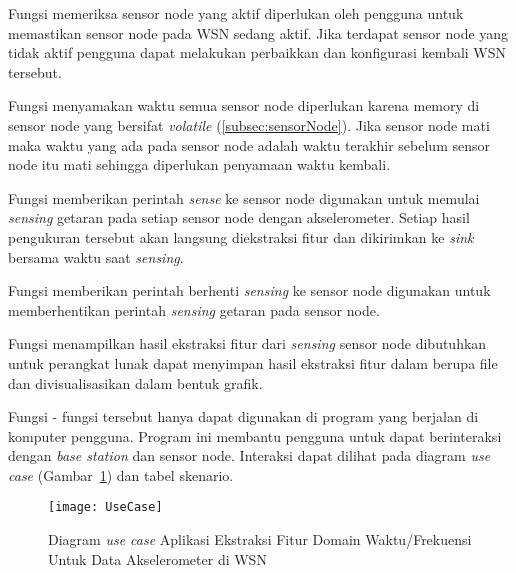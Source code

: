 Fungsi memeriksa sensor node yang aktif diperlukan oleh pengguna untuk memastikan sensor node pada WSN sedang aktif. Jika terdapat sensor node yang tidak aktif pengguna dapat melakukan perbaikkan dan konfigurasi kembali WSN tersebut.

Fungsi menyamakan waktu semua sensor node diperlukan karena memory di sensor node yang bersifat {\it volatile} (\ref{subsec:sensorNode}). Jika sensor node mati maka waktu yang ada pada sensor node adalah waktu terakhir sebelum sensor node itu mati sehingga diperlukan penyamaan waktu kembali.

Fungsi memberikan perintah {\it sense} ke sensor node digunakan untuk memulai {\it sensing} getaran pada setiap sensor node dengan akselerometer. Setiap hasil pengukuran tersebut akan langsung diekstraksi fitur dan dikirimkan ke {\it sink} bersama waktu saat {\it sensing}.

Fungsi memberikan perintah berhenti {\it sensing} ke sensor node digunakan untuk memberhentikan perintah {\it sensing} getaran pada sensor node. 

Fungsi menampilkan hasil ekstraksi fitur dari {\it sensing} sensor node dibutuhkan untuk perangkat lunak dapat menyimpan hasil ekstraksi fitur dalam berupa file dan divisualisasikan dalam bentuk grafik.  

Fungsi - fungsi tersebut hanya dapat digunakan di program yang berjalan di komputer pengguna. Program ini membantu pengguna untuk dapat berinteraksi dengan {\it base station} dan sensor node. Interaksi dapat dilihat pada diagram {\it use case} (Gambar~\ref{fig:UseCase}) dan tabel skenario.



\begin{figure} [H]
	\centering  
	\texttt{[image: UseCase]}  
	\caption[ Diagram {\it use case} Aplikasi Ekstraksi Fitur Domain Waktu/Frekuensi Untuk Data Akselerometer di WSN]{Diagram {\it use case} Aplikasi Ekstraksi Fitur Domain Waktu/Frekuensi Untuk Data Akselerometer di WSN} 
	\label{fig:UseCase} 
\end{figure} 


